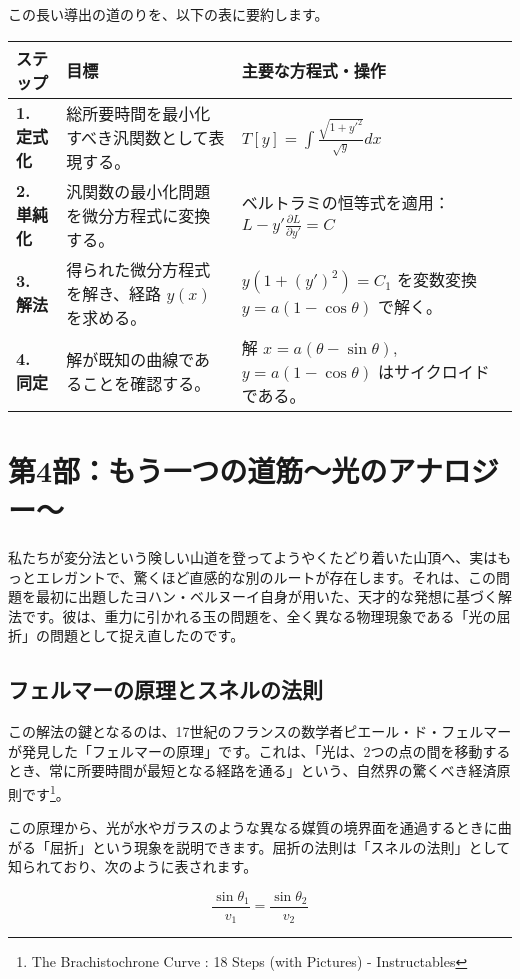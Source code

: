 \documentclass[a4paper,12pt]{bxjsarticle}
\begin{document}
この長い導出の道のりを、以下の表に要約します。

\begin{longtable}{|p{2.5cm}|p{4cm}|p{6cm}|}
\hline
\textbf{ステップ} & \textbf{目標} & \textbf{主要な方程式・操作} \\
\hline
\textbf{1. 定式化} & 総所要時間を最小化すべき汎関数として表現する。 & $T[y]=\int\frac{\sqrt{1+y'^2}}{\sqrt{y}}dx$ \\
\hline
\textbf{2. 単純化} & 汎関数の最小化問題を微分方程式に変換する。 & ベルトラミの恒等式を適用：$L-y'\frac{\partial L}{\partial y'}=C$ \\
\hline
\textbf{3. 解法} & 得られた微分方程式を解き、経路 $y(x)$ を求める。 & $y(1+(y')^2)=C_1$ を変数変換 $y=a(1-\cos\theta)$ で解く。 \\
\hline
\textbf{4. 同定} & 解が既知の曲線であることを確認する。 & 解 $x=a(\theta-\sin\theta)$, $y=a(1-\cos\theta)$ はサイクロイドである。 \\
\hline
\end{longtable}

\section{第4部：もう一つの道筋〜光のアナロジー〜}

私たちが変分法という険しい山道を登ってようやくたどり着いた山頂へ、実はもっとエレガントで、驚くほど直感的な別のルートが存在します。それは、この問題を最初に出題したヨハン・ベルヌーイ自身が用いた、天才的な発想に基づく解法です。彼は、重力に引かれる玉の問題を、全く異なる物理現象である「光の屈折」の問題として捉え直したのです。

\subsection{フェルマーの原理とスネルの法則}

この解法の鍵となるのは、17世紀のフランスの数学者ピエール・ド・フェルマーが発見した「フェルマーの原理」です。これは、「光は、2つの点の間を移動するとき、常に所要時間が最短となる経路を通る」という、自然界の驚くべき経済原則です\footnote{The Brachistochrone Curve : 18 Steps (with Pictures) - Instructables}。

この原理から、光が水やガラスのような異なる媒質の境界面を通過するときに曲がる「屈折」という現象を説明できます。屈折の法則は「スネルの法則」として知られており、次のように表されます。

\begin{equation}
\frac{\sin\theta_1}{v_1}=\frac{\sin\theta_2}{v_2}
\end{equation}
\end{document}
